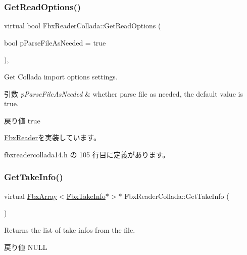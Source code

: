 \subsubsection{\texorpdfstring{Get\+Read\+Options()}{GetReadOptions()}}
{\footnotesize\ttfamily virtual bool Fbx\+Reader\+Collada\+::\+Get\+Read\+Options (\begin{DoxyParamCaption}\item[{bool}]{p\+Parse\+File\+As\+Needed = {\ttfamily true} }\end{DoxyParamCaption})\hspace{0.3cm}{\ttfamily [inline]}, {\ttfamily [virtual]}}

Get Collada import options settings. 
\begin{DoxyParams}{引数}
{\em p\+Parse\+File\+As\+Needed} & whether parse file as needed, the default value is true. \\
\hline
\end{DoxyParams}
\begin{DoxyReturn}{戻り値}
true 
\end{DoxyReturn}


\hyperlink{class_fbx_reader_acea3c118db490378c9aed17512396932}{Fbx\+Reader}を実装しています。



 fbxreadercollada14.\+h の 105 行目に定義があります。

\mbox{\label{class_fbx_reader_collada_af772ad8fc79672d06aa9ea6910b81ab0}} 
\subsubsection{\texorpdfstring{Get\+Take\+Info()}{GetTakeInfo()}}
{\footnotesize\ttfamily virtual \hyperlink{class_fbx_array}{Fbx\+Array}$<$\hyperlink{class_fbx_take_info}{Fbx\+Take\+Info}$\ast$$>$$\ast$ Fbx\+Reader\+Collada\+::\+Get\+Take\+Info (\begin{DoxyParamCaption}{ }\end{DoxyParamCaption})\hspace{0.3cm}{\ttfamily [virtual]}}

Returns the list of take infos from the file. \begin{DoxyReturn}{戻り値}
N\+U\+LL 
\end{DoxyReturn}


